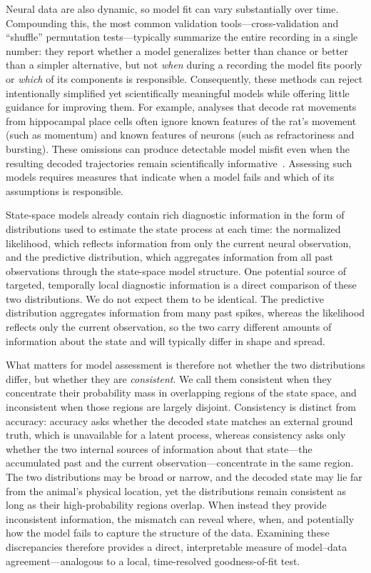 \documentclass[12pt]{article}
\begin{document}
Neural data are also dynamic, so model fit can vary substantially over time. Compounding this, the most common validation tools---cross-validation and ``shuffle'' permutation tests---typically summarize the entire recording in a single number: they report whether a model generalizes better than chance or better than a simpler alternative, but not \emph{when} during a recording the model fits poorly or \emph{which} of its components is responsible. Consequently, these methods can reject intentionally simplified yet scientifically meaningful models while offering little guidance for improving them. For example, analyses that decode rat movements from hippocampal place cells often ignore known features of the rat's movement (such as momentum) and known features of neurons (such as refractoriness and bursting). These omissions can produce detectable model misfit even when the resulting decoded trajectories remain scientifically informative~\cite{DengClusterlessDecodingPosition2015,Taocommongoodnessoffitframework2018,zengStateSpaceFrameworkCausal2026}. Assessing such models requires measures that indicate when a model fails and which of its assumptions is responsible.

State-space models already contain rich diagnostic information in the form of distributions used to estimate the state process at each time: the normalized likelihood, which reflects information from only the current neural observation, and the predictive distribution, which aggregates information from all past observations through the state-space model structure. One potential source of targeted, temporally local diagnostic information is a direct comparison of these two distributions. We do not expect them to be identical. The predictive distribution aggregates information from many past spikes, whereas the likelihood reflects only the current observation, so the two carry different amounts of information about the state and will typically differ in shape and spread.

What matters for model assessment is therefore not whether the two distributions differ, but whether they are \emph{consistent}. We call them consistent when they concentrate their probability mass in overlapping regions of the state space, and inconsistent when those regions are largely disjoint. Consistency is distinct from accuracy: accuracy asks whether the decoded state matches an external ground truth, which is unavailable for a latent process, whereas consistency asks only whether the two internal sources of information about that state---the accumulated past and the current observation---concentrate in the same region. The two distributions may be broad or narrow, and the decoded state may lie far from the animal's physical location, yet the distributions remain consistent as long as their high-probability regions overlap. When instead they provide inconsistent information, the mismatch can reveal where, when, and potentially how the model fails to capture the structure of the data. Examining these discrepancies therefore provides a direct, interpretable measure of model--data agreement---analogous to a local, time-resolved goodness-of-fit test.
\end{document}
